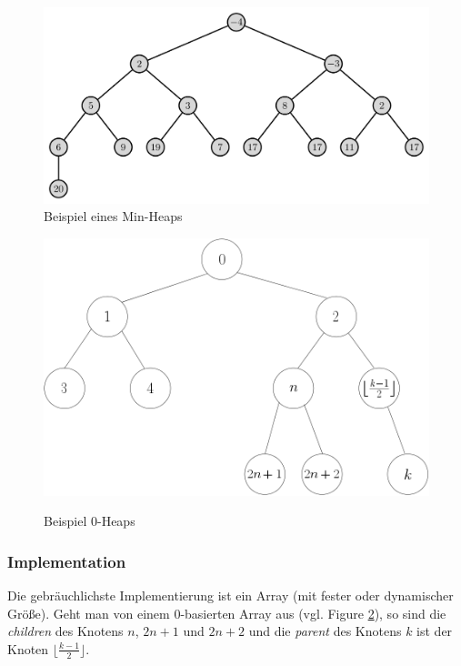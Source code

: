 \documentclass[a4paper]{article}
\begin{document}
\begin{figure}[h] 
\caption{Beispiel eines Min-Heaps}
\centering
\label{fig: Min-heap}
\includegraphics[scale= 0.2]{Pictures/Heap.svg.png}
\end{figure}

\begin{figure}[h] 
\caption{Beispiel 0-Heaps}
\centering
\includegraphics[scale= 0.5]{Pictures/0-heap.png}
\label{fig: 0-Heap}
\end{figure}



\subsubsection*{Implementation}
Die gebräuchlichste Implementierung ist ein Array (mit fester oder dynamischer Größe). Geht man von einem 0-basierten Array aus (vgl. Figure \ref{fig: 0-Heap}), so sind die \textit{children} des Knotens $n$, $2n+1$ und $2n+2$ und die \textit{parent} des Knotens $k$ ist der Knoten $\lfloor \frac{k-1}{2}\rfloor$.

\newpage
\end{document}
